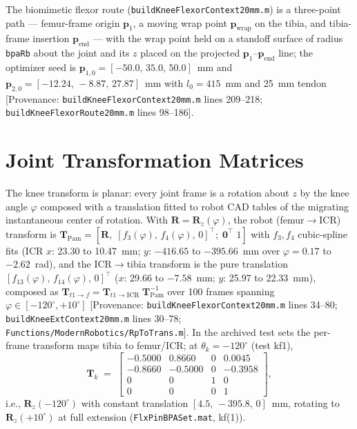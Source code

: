 The biomimetic flexor route (\texttt{buildKneeFlexorContext20mm.m}) is a three-point path --- femur-frame origin $\mathbf{p}_{1}$, a moving wrap point $\mathbf{p}_{\text{wrap}}$ on the tibia, and tibia-frame insertion $\mathbf{p}_{\text{end}}$ --- with the wrap point held on a standoff surface of radius \texttt{bpaRb} about the joint and its $z$ placed on the projected $\mathbf{p}_{1}$--$\mathbf{p}_{\text{end}}$ line; the optimizer seed is $\mathbf{p}_{1,0} = [-50.0,\,35.0,\,50.0]$~mm and $\mathbf{p}_{2,0} = [-12.24,\,-8.87,\,27.87]$~mm with $l_{0} = 415$~mm and 25~mm tendon [Provenance: \texttt{buildKneeFlexorContext20mm.m} lines 209--218; \texttt{buildKneeFlexorRoute20mm.m} lines 98--186].

\section{Joint Transformation Matrices}

The knee transform is planar: every joint frame is a rotation about $z$ by the knee angle $\varphi$ composed with a translation fitted to robot CAD tables of the migrating instantaneous center of rotation. With $\mathbf{R} = \mathbf{R}_{z}(\varphi)$, the robot (femur$\to$ICR) transform is $\mathbf{T}_{\text{Pam}} = [\mathbf{R},\; [f_{3}(\varphi),\,f_{4}(\varphi),\,0]^{\top};\; \mathbf{0}^{\top}\;1]$ with $f_{3}, f_{4}$ cubic-spline fits (ICR $x$: 23.30 to 10.47~mm; $y$: $-416.65$ to $-395.66$~mm over $\varphi = 0.17$ to $-2.62$~rad), and the ICR$\to$tibia transform is the pure translation $[f_{13}(\varphi),\,f_{14}(\varphi),\,0]^{\top}$ ($x$: 29.66 to $-7.58$~mm; $y$: 25.97 to 22.33~mm), composed as $\mathbf{T}_{t1\!\to\!f} = \mathbf{T}_{t1\!\to\!\text{ICR}}\;\mathbf{T}_{\text{Pam}}^{-1}$ over 100 frames spanning $\varphi \in [-120^{\circ}, +10^{\circ}]$ [Provenance: \texttt{buildKneeFlexorContext20mm.m} lines 34--80; \texttt{buildKneeExtContext20mm.m} lines 30--78; \texttt{Functions/ModernRobotics/RpToTrans.m}]. In the archived test sets the per-frame transform maps tibia to femur/ICR; at $\theta_{k}=-120^{\circ}$ (test kf1),
\begin{equation}
    \mathbf{T}_{k} \;=\;
    \begin{bmatrix}
    -0.5000 & 0.8660 & 0 & 0.0045\\
    -0.8660 & -0.5000 & 0 & -0.3958\\
    0 & 0 & 1 & 0\\
    0 & 0 & 0 & 1
    \end{bmatrix},
    \label{eq:app_Tk}
\end{equation}
i.e., $\mathbf{R}_{z}(-120^{\circ})$ with constant translation $[4.5,\,-395.8,\,0]$~mm, rotating to $\mathbf{R}_{z}(+10^{\circ})$ at full extension (\texttt{FlxPinBPASet.mat}, kf(1)).

